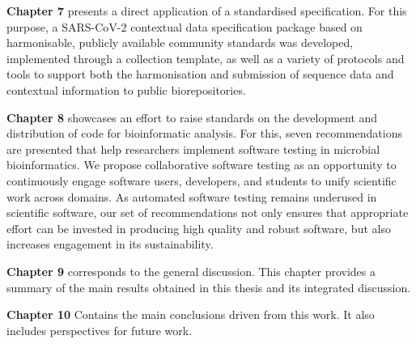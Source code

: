 \textbf{Chapter 7} presents a direct application of a standardised specification. For this purpose, a SARS-CoV-2 contextual data specification package based on harmonisable, publicly available community standards was developed, implemented through a collection template, as well as a variety of protocols and tools to support both the harmonisation and submission of sequence data and contextual information to public biorepositories. 

\textbf{Chapter 8} showcases an effort to raise standards on the development and distribution of code for bioinformatic analysis. For this, seven recommendations are presented that help researchers implement software testing in microbial bioinformatics. We propose collaborative software testing as an opportunity to continuously engage software users, developers, and students to unify scientific work across domains. As automated software testing remains underused in scientific software, our set of recommendations not only ensures that appropriate effort can be invested in producing high quality and robust software, but also increases engagement in its sustainability.  

\textbf{Chapter 9} corresponds to the general discussion. This chapter provides a summary of the main results obtained in this thesis and its integrated discussion. 

\textbf{Chapter 10} Contains the main conclusions driven from this work. It also includes perspectives for future work. 